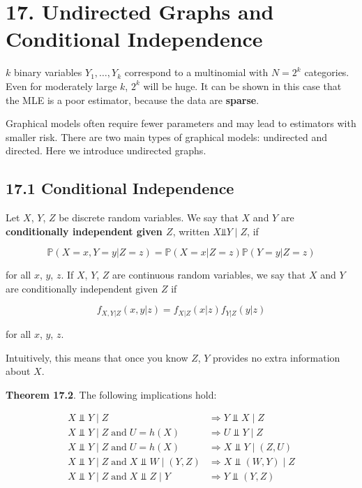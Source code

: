 \section*{17. Undirected Graphs and Conditional Independence}\label{undirected-graphs-and-conditional-independence}

\(k\) binary variables \(Y_{1}, \dots, Y_{k}\) correspond to a multinomial
with \(N = 2^{k}\) categories. Even for moderately large \(k\), \(2^{k}\)
will be huge. It can be shown in this case that the MLE is a poor
estimator, because the data are \textbf{sparse}.

Graphical models often require fewer parameters and may lead to
estimators with smaller risk. There are two main types of graphical
models: undirected and directed. Here we introduce undirected graphs.

\subsection*{17.1 Conditional Independence}\label{conditional-independence}

Let \(X\), \(Y\), \(Z\) be discrete random variables. We say that \(X\)
and \(Y\) are \textbf{conditionally independent given \(Z\)}, written
\(X \text{⫫} Y \;|\; Z\), if

\[ \mathbb{P}(X = x, Y = y | Z = z) = \mathbb{P}(X = x | Z = z) \mathbb{P}(Y = y | Z = z)\]

for all \(x\), \(y\), \(z\). If \(X\), \(Y\), \(Z\) are continuous
random variables, we say that \(X\) and \(Y\) are conditionally
independent given \(Z\) if

\[ f_{X, Y | Z}(x, y | z) = f_{X | Z}(x | z) f_{Y | Z}(y | z) \]

for all \(x\), \(y\), \(z\).

Intuitively, this means that once you know \(Z\), \(Y\) provides no
extra information about \(X\).

\textbf{Theorem 17.2}. The following implications hold:

\begin{align*}
X \text{ ⫫ } Y \;|\; Z & \Longrightarrow Y \text{ ⫫ } X \;|\; Z \\
X \text{ ⫫ } Y \;|\; Z \; \text{and} \; U = h(X) & \Longrightarrow U \text{ ⫫ } Y \;|\; Z \\
X \text{ ⫫ } Y \;|\; Z \; \text{and} \; U = h(X) & \Longrightarrow X \text{ ⫫ } Y \;|\; (Z, U)  \\
X \text{ ⫫ } Y \;|\; Z \; \text{and} \; X \text{ ⫫ } W \;|\; (Y, Z) & \Longrightarrow X \text{ ⫫ } (W, Y) \;|\; Z \\
X \text{ ⫫ } Y \;|\; Z \; \text{and} \; X \text{ ⫫ } Z \;|\; Y \; & \Longrightarrow Y \text{ ⫫ } (Y, Z)
\end{align*}

